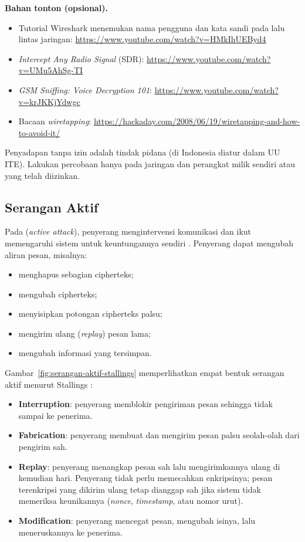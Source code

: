 \begin{catatan}
\textbf{Bahan tonton (opsional).}
\begin{itemize}
  \item Tutorial Wireshark menemukan nama pengguna dan kata sandi pada lalu lintas jaringan: \url{https://www.youtube.com/watch?v=HMkIhUEByd4}
  \item \textit{Intercept Any Radio Signal} (SDR): \url{https://www.youtube.com/watch?v=UMu5AhSg-TI}
  \item \textit{GSM Sniffing: Voice Decryption 101}: \url{https://www.youtube.com/watch?v=krJKKjYdwgc}
  \item Bacaan \textit{wiretapping}: \url{https://hackaday.com/2008/06/19/wiretapping-and-how-to-avoid-it/}
\end{itemize}
Penyadapan tanpa izin adalah tindak pidana (di Indonesia diatur dalam UU ITE). Lakukan percobaan hanya pada jaringan dan perangkat milik sendiri atau yang telah diizinkan.
\end{catatan}

\subsection{Serangan Aktif}

Pada  (\textit{active attack}), penyerang mengintervensi komunikasi dan ikut memengaruhi sistem untuk keuntungannya sendiri \cite{munir_slides_itb}. Penyerang dapat mengubah aliran pesan, misalnya:
\begin{itemize}
  \item menghapus sebagian cipherteks;
  \item mengubah cipherteks;
  \item menyisipkan potongan cipherteks palsu;
  \item mengirim ulang (\textit{replay}) pesan lama;
  \item mengubah informasi yang tersimpan.
\end{itemize}

Gambar~\ref{fig:serangan-aktif-stallings} memperlihatkan empat bentuk serangan aktif menurut Stallings \cite{stallings2017}:
\begin{itemize}
  \item \textbf{Interruption}: penyerang memblokir pengiriman pesan sehingga tidak sampai ke penerima.
  \item \textbf{Fabrication}: penyerang membuat dan mengirim pesan palsu seolah-olah dari pengirim sah.
  \item \textbf{Replay}: penyerang menangkap pesan sah lalu mengirimkannya ulang di kemudian hari. Penyerang tidak perlu memecahkan enkripsinya; pesan terenkripsi yang dikirim ulang tetap dianggap sah jika sistem tidak memeriksa keunikannya (\textit{nonce}, \textit{timestamp}, atau nomor urut).
  \item \textbf{Modification}: penyerang mencegat pesan, mengubah isinya, lalu meneruskannya ke penerima.
\end{itemize}

